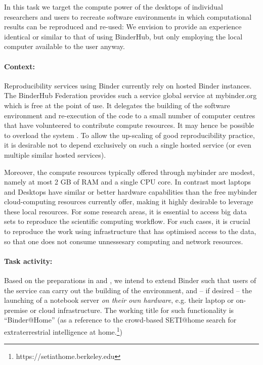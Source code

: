 \begin{task}[
  title=Binder@Home,
  id=binder-at-home,
  lead=SRL,
  PM=7,
  partners={MP,UIO}
]
In this task we target the compute power of the desktops of individual researchers and
users to recreate software environments in which computational results can be
reproduced and re-used: We envision to provide an experience identical or similar
to that of using BinderHub, but only employing the local computer available to the user anyway.

\paragraph*{Context:} Reproducibility services using Binder currently rely on hosted Binder instances.
The BinderHub Federation provides such a service global service at mybinder.org
which is free at
the point of use. It delegates the building of the software environment and
re-execution of the code to a small number of computer centres that have
volunteered to contribute compute resources.
It may hence be possible to overload the system .
To allow the up-scaling of good reproducibility practice, it is 
desirable not to depend exclusively on such a single hosted service (or even multiple similar hosted services).

Moreover, the compute resources typically offered through mybinder are modest, namely at most 2 GB of RAM
and a single CPU core.
In contrast most laptops and Desktops have similar or better hardware capabilities than
the free mybinder cloud-computing resources currently offer, making it highly desirable to leverage these local resources.
For some research areas, it is essential to access big data sets to reproduce the scientific computing workflow.
For such cases, it is crucial to reproduce the work using infrastructure that has optimised access to the data,
so that one does not consume unnessesary computing and network resources.  

\paragraph*{Task activity:} Based on the preparations in  and
, we intend to extend Binder such that users of the service can
carry out the building of the environment, and -- if desired -- the launching of a
notebook server \emph{on their own hardware}, e.g. their laptop or on-premise or cloud infrastructure.
The working title for such
functionality is ``Binder@Home'' (as a reference to the crowd-based SETI@home search for
extraterrestrial intelligence at home.\footnote{https://setiathome.berkeley.edu})


\end{task}
